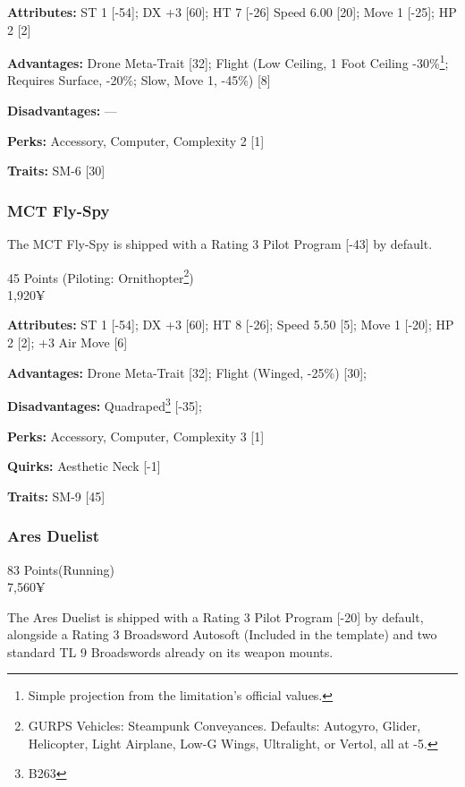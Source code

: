 \begin{multicols*}{2}
	\textbf{Attributes:} 
	ST 1 [-54]; DX +3 [60]; HT 7 [-26]
	Speed 6.00 [20]; Move 1 [-25]; HP 2 [2]
	
	\textbf{Advantages:} 
	Drone Meta-Trait [32]; Flight (Low Ceiling, 1 Foot Ceiling -30\%\footnote{Simple projection from the limitation's official values.}; Requires Surface, -20\%; Slow, Move 1, -45\%) [8]

	\textbf{Disadvantages:} 
	—
	
	\textbf{Perks:}
	Accessory, Computer, Complexity 2 [1]
	
	\textbf{Traits:}
	SM-6 [30]	
	
	\subsubsection{MCT Fly-Spy}
	
	The MCT Fly-Spy is shipped with a Rating 3 Pilot Program [-43] by default.
	
	\begin{flushright}
		45 Points (Piloting: Ornithopter\footnote{GURPS Vehicles: Steampunk Conveyances. Defaults: Autogyro, Glider, Helicopter, Light Airplane, Low-G Wings, Ultralight, or Vertol, all at -5.})\\
		1,920¥
	\end{flushright}
	
	\textbf{Attributes:} 
	ST 1 [-54]; DX +3 [60]; HT 8 [-26];
	Speed 5.50 [5]; Move 1 [-20]; HP 2 [2]; +3 Air Move [6]
	
	\textbf{Advantages:} 
	Drone Meta-Trait [32]; Flight (Winged, -25\%) [30];
	
	\textbf{Disadvantages:} 
	Quadraped\footnote{B263} [-35];
	
	\textbf{Perks:}
	Accessory, Computer, Complexity 3 [1]
	
	\textbf{Quirks:}
	Aesthetic Neck [-1]
	
	\textbf{Traits:}
	SM-9 [45]
	
	\subsubsection{Ares Duelist}
	\begin{flushright}
		83 Points(Running)\\
		7,560¥
	\end{flushright}

	The Ares Duelist is shipped with a Rating 3 Pilot Program [-20] by default, alongside a Rating 3 Broadsword Autosoft (Included in the template) and two standard TL 9 Broadswords already on its weapon mounts.


\end{multicols*}
